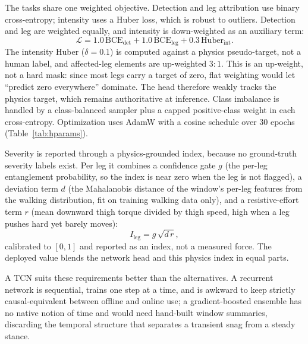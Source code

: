 The tasks share one weighted objective. Detection and leg attribution use binary cross-entropy; intensity uses a Huber loss, which is robust to outliers. Detection and leg are weighted equally, and intensity is down-weighted as an auxiliary term:
\begin{equation}
\mathcal{L} = 1.0\,\mathrm{BCE}_{\text{det}} + 1.0\,\mathrm{BCE}_{\text{leg}} + 0.3\,\mathrm{Huber}_{\text{int}} .
\end{equation}
The intensity Huber ($\delta=0.1$) is computed against a physics pseudo-target, not a human label, and affected-leg elements are up-weighted $3{:}1$. This is an up-weight, not a hard mask: since most legs carry a target of zero, flat weighting would let ``predict zero everywhere'' dominate. The head therefore weakly tracks the physics target, which remains authoritative at inference. Class imbalance is handled by a class-balanced sampler plus a capped positive-class weight in each cross-entropy. Optimization uses AdamW \cite{loshchilov2019adamw} with a cosine schedule over 30 epochs (Table~\ref{tab:hparams}).

Severity is reported through a physics-grounded index, because no ground-truth severity labels exist. Per leg it combines a confidence gate $g$ (the per-leg entanglement probability, so the index is near zero when the leg is not flagged), a deviation term $d$ (the Mahalanobis distance of the window's per-leg features from the walking distribution, fit on training walking data only), and a resistive-effort term $r$ (mean downward thigh torque divided by thigh speed, high when a leg pushes hard yet barely moves):
\begin{equation}
I_{\text{leg}} = g\,\sqrt{d\,r},
\end{equation}
calibrated to $[0,1]$ and reported as an index, not a measured force. The deployed value blends the network head and this physics index in equal parts.

A TCN suits these requirements better than the alternatives. A recurrent network is sequential, trains one step at a time, and is awkward to keep strictly causal-equivalent between offline and online use; a gradient-boosted ensemble has no native notion of time and would need hand-built window summaries, discarding the temporal structure that separates a transient snag from a steady stance.
